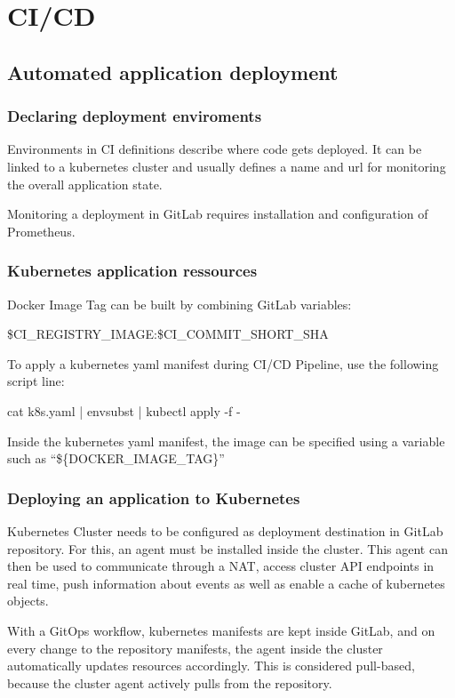 \section{CI/CD}

\subsection{Automated application deployment}

\subsubsection{Declaring deployment enviroments}

Environments in CI definitions describe where code gets deployed. It can be linked to a kubernetes cluster and usually 
defines a name and url for monitoring the overall application state.

Monitoring a deployment in GitLab requires installation and configuration of Prometheus.  

\subsubsection{Kubernetes application ressources}
Docker Image Tag can be built by combining GitLab variables: 

\ttfamily 
\$CI\_REGISTRY\_IMAGE:\$CI\_COMMIT\_SHORT\_SHA 
\rmfamily

To apply a kubernetes yaml manifest during CI/CD Pipeline, use the following script line:

\ttfamily
cat k8s.yaml | envsubst | kubectl apply -f -
\rmfamily

Inside the kubernetes yaml manifest, the image can be specified using a variable such as
``\$\{DOCKER\_IMAGE\_TAG\}'' 

\subsubsection{Deploying an application to Kubernetes}
Kubernetes Cluster needs to be configured as deployment destination in GitLab repository. 
For this, an agent must be installed inside the cluster. This agent can then be used to communicate through a NAT, access
cluster API endpoints in real time, push information about events as well as enable a cache of kubernetes objects.

With a GitOps workflow, kubernetes manifests are kept inside GitLab, and on every change to the repository manifests, 
the agent inside the cluster automatically updates resources accordingly. This is considered pull-based, because the cluster
agent actively pulls from the repository.   

